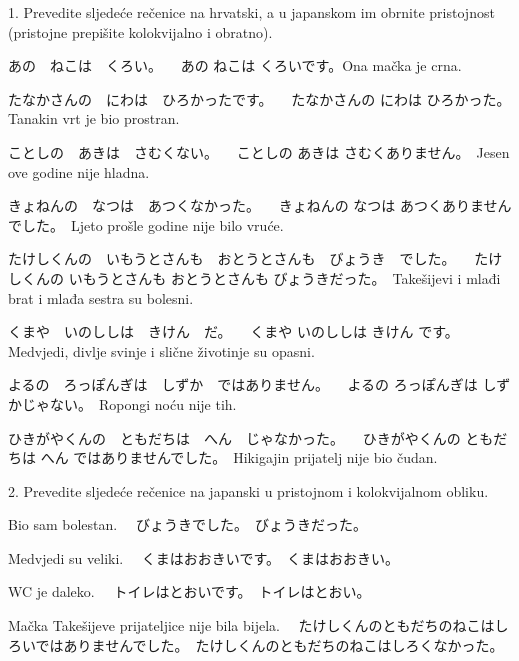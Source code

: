 
\author{Katja Kržišnik}

	
	\begin{mondai}{1. Prevedite sljedeće rečenice na hrvatski, a u japanskom im obrnite pristojnost (pristojne prepišite kolokvijalno i obratno).}
		\item あの　ねこは　くろい。 \newline　あの ねこは くろいです。Ona mačka je crna.　
		\item たなかさんの　にわは　ひろかったです。 \newline　たなかさんの にわは ひろかった。　Tanakin vrt je bio prostran.　
		\item ことしの　あきは　さむくない。 \newline　ことしの あきは さむくありません。　Jesen ove godine nije hladna.
		\item きょねんの　なつは　あつくなかった。 \newline　きょねんの なつは あつくありませんでした。　Ljeto prošle godine nije bilo vruće.　
		\item たけしくんの　いもうとさんも　おとうとさんも　びょうき　でした。 \newline　たけしくんの いもうとさんも おとうとさんも びょうきだった。　Takešijevi i mlađi brat i mlađa sestra su bolesni.
		\item くまや　いのししは　きけん　だ。 \newline　くまや いのししは きけん です。　Medvjedi, divlje svinje i slične životinje su opasni.
		\item よるの　ろっぽんぎは　しずか　ではありません。 \newline　よるの ろっぽんぎは しずかじゃない。　Ropongi noću nije tih. 
		\item ひきがやくんの　ともだちは　へん　じゃなかった。 \newline　ひきがやくんの ともだちは へん ではありませんでした。　Hikigajin prijatelj nije bio čudan.
	\end{mondai}
	
	\begin{mondai}{2. Prevedite sljedeće rečenice na japanski u pristojnom i kolokvijalnom obliku.}
		\item Bio sam bolestan. \newline　びょうきでした。　びょうきだった。
		\item Medvjedi su veliki. \newline　くまはおおきいです。　くまはおおきい。
		\item WC je daleko. \newline　トイレはとおいです。　トイレはとおい。
		\item Mačka Takešijeve prijateljice nije bila bijela. \newline　たけしくんのともだちのねこはしろいではありませんでした。　たけしくんのともだちのねこはしろくなかった。
	\end{mondai}
